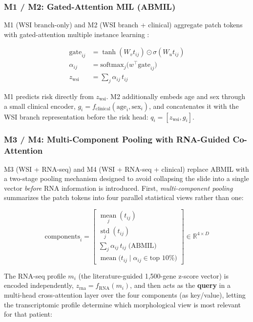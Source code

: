 \subsubsection{M1 / M2: Gated-Attention MIL (ABMIL)}

M1 (WSI branch-only) and M2 (WSI branch + clinical) aggregate patch tokens with
gated-attention multiple instance learning \cite{ilse2018abmil}:

\begin{align}
  \mathrm{gate}_{ij} &= \tanh(W_v t_{ij}) \odot \sigma(W_u t_{ij}) \\
  \alpha_{ij} &= \mathrm{softmax}_j\big(w^\top \mathrm{gate}_{ij}\big) \\
  z_{\mathrm{wsi}} &= \sum_j \alpha_{ij}\, t_{ij}
\end{align}

M1 predicts risk directly from $z_{\mathrm{wsi}}$. M2 additionally embeds age and
sex through a small clinical encoder, $g_i = f_{\mathrm{clinical}}(\mathrm{age}_i,
\mathrm{sex}_i)$, and concatenates it with the WSI branch representation before the risk head: $q_i = [z_{\mathrm{wsi}}, g_i]$.

\subsubsection{M3 / M4: Multi-Component Pooling with RNA-Guided Co-Attention}

M3 (WSI + RNA-seq) and M4 (WSI + RNA-seq + clinical) replace ABMIL with
a two-stage pooling mechanism designed to avoid collapsing the slide into a single
vector \emph{before} RNA information is introduced. First, \emph{multi-component
pooling} summarizes the patch tokens into four parallel statistical views rather
than one:

\begin{equation}
  \mathrm{components}_i =
  \begin{bmatrix}
    \displaystyle\operatorname*{mean}_j(t_{ij}) \\[4pt]
    \displaystyle\operatorname*{std}_j(t_{ij}) \\[4pt]
    \displaystyle\sum_j \alpha_{ij}\, t_{ij} \;\text{(ABMIL)} \\[4pt]
    \displaystyle\operatorname*{mean}\big(t_{ij} \mid \alpha_{ij} \in \text{top } 10\%\big)
  \end{bmatrix}
  \in \mathbb{R}^{4 \times D}
\end{equation}

The RNA-seq profile $m_i$ (the literature-guided 1,500-gene z-score vector) is encoded independently,
$z_{\mathrm{rna}} = f_{\mathrm{RNA}}(m_i)$, and then acts as the \textbf{query} in a
multi-head cross-attention layer over the four components (as key/value), letting
the transcriptomic profile determine which morphological view is most relevant for
that patient:

